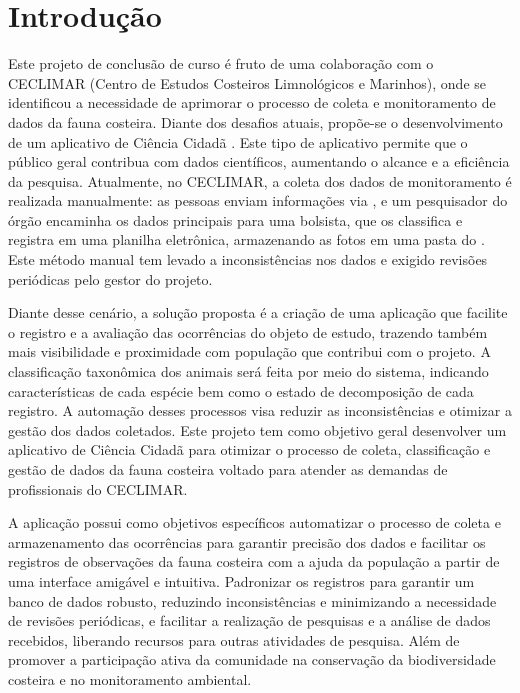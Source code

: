 
\chapter{Introdução} \label{chapter:intro}

Este projeto de conclusão de curso é fruto de uma colaboração com o CECLIMAR (Centro de Estudos Costeiros 
Limnológicos e Marinhos), onde se identificou a necessidade de aprimorar o processo de coleta e monitoramento 
de dados da fauna costeira. Diante dos desafios atuais, propõe-se o desenvolvimento de um aplicativo de 
Ciência Cidadã \cite{Martins_Cabral_2021}. Este tipo de aplicativo permite que o público geral contribua 
com dados científicos, aumentando o alcance e a eficiência da pesquisa.
Atualmente, no CECLIMAR, a coleta dos dados de monitoramento é realizada manualmente: as pessoas enviam 
informações via , e um pesquisador do órgão encaminha os dados principais para uma 
bolsista, que os classifica e registra em uma planilha eletrônica, armazenando as fotos em uma pasta do 
. Este método manual tem levado a inconsistências nos dados e exigido revisões 
periódicas pelo gestor do projeto.

Diante desse cenário, a solução proposta é a criação de uma aplicação que facilite o registro e a avaliação das ocorrências  
do objeto de estudo, trazendo também mais visibilidade e proximidade com população que contribui com o projeto. 
A classificação taxonômica dos animais será feita por meio do 
sistema, indicando características de cada espécie bem como o estado de decomposição de cada registro. 
A automação desses processos visa reduzir as inconsistências e otimizar a gestão dos dados coletados.
Este projeto tem como objetivo geral desenvolver um aplicativo de Ciência Cidadã para otimizar o processo 
de coleta, classificação e gestão de dados da fauna costeira voltado para atender as demandas de 
profissionais do CECLIMAR.

A aplicação possui como objetivos específicos automatizar o processo de coleta e armazenamento das 
ocorrências para garantir precisão dos dados e facilitar os registros de observações da fauna costeira 
com a ajuda da população a partir de uma interface amigável e intuitiva. Padronizar os registros 
para garantir um banco de dados robusto, reduzindo inconsistências e minimizando a necessidade de 
revisões periódicas, e facilitar a realização de pesquisas e a 
análise de dados recebidos, liberando recursos para outras atividades de pesquisa. Além de promover 
a participação ativa da comunidade na conservação da biodiversidade costeira e no monitoramento ambiental.

